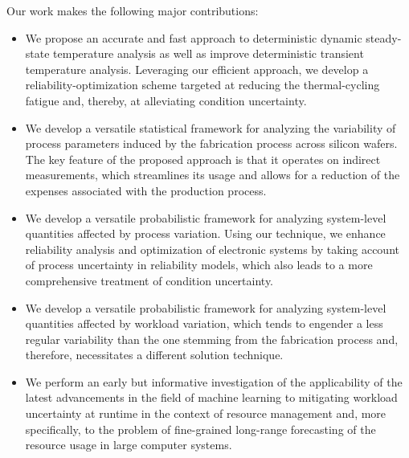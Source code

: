 Our work makes the following major contributions:

\begin{itemize}

\item
We propose an accurate and fast approach to deterministic dynamic steady-state
temperature analysis as well as improve deterministic transient temperature
analysis. Leveraging our efficient approach, we develop a
reliability-optimization scheme targeted at reducing the thermal-cycling fatigue
and, thereby, at alleviating condition uncertainty.

\item
We develop a versatile statistical framework for analyzing the variability of
process parameters induced by the fabrication process across silicon wafers. The
key feature of the proposed approach is that it operates on indirect
measurements, which streamlines its usage and allows for a reduction of the
expenses associated with the production process.

\item
We develop a versatile probabilistic framework for analyzing system-level
quantities affected by process variation. Using our technique, we enhance
reliability analysis and optimization of electronic systems by taking account of
process uncertainty in reliability models, which also leads to a more
comprehensive treatment of condition uncertainty.

\item
We develop a versatile probabilistic framework for analyzing system-level
quantities affected by workload variation, which tends to engender a less
regular variability than the one stemming from the fabrication process and,
therefore, necessitates a different solution technique.

\item
We perform an early but informative investigation of the applicability of the
latest advancements in the field of machine learning to mitigating workload
uncertainty at runtime in the context of resource management and, more
specifically, to the problem of fine-grained long-range forecasting of the
resource usage in large computer systems.

\end{itemize}
